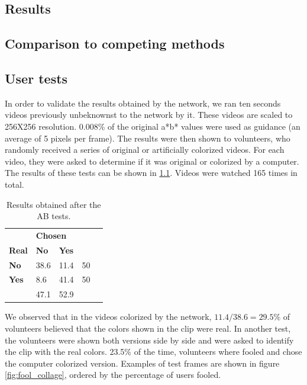 \documentclass[12pt,openright,oneside,a4paper,english]{abntex2}
\begin{document}
\begin{otherlanguage}{english}
\chapter{Results}

\section{Comparison to competing methods}


\section{User tests}

In order to validate the results obtained by the network, we ran ten seconds videos previously unbeknownst to the network by it. These videos are scaled to 256X256 resolution. 0.008\% of the original a*b* values were used as guidance (an average of 5 pixels per frame). The results were then shown to volunteers, who randomly received a series of original or artificially colorized videos. For each video, they were asked to determine if it was original or colorized by a computer. The results of these tests can be shown in \ref{table:ABresults}. Videos were watched 165 times in total.

\begin{table}[H]
\centering
\begin{tabular}{l|l|l|ll}
\cline{2-3}
                                    & \multicolumn{2}{l|}{\textbf{Chosen}} &                           &  \\ \cline{1-3}
\multicolumn{1}{|l|}{\textbf{Real}} & \textbf{No}      & \textbf{Yes}      &                           &  \\ \cline{1-4}
\multicolumn{1}{|l|}{\textbf{No}}   & 38.6             & 11.4              & \multicolumn{1}{l|}{50} &  \\ \cline{1-4}
\multicolumn{1}{|l|}{\textbf{Yes}}  & 8.6              & 41.4              & \multicolumn{1}{l|}{50} &  \\ \cline{1-4}
                                    & 47.1             & 52.9              &                           &  \\ \cline{2-3}
\end{tabular}
\label{table:ABresults}
\caption{Results obtained after the AB tests.}
\end{table}

We observed that in the videos colorized by the network, \(11.4/38.6 = 29.5\% \) of volunteers  believed that the colors shown in the clip were real. In another test, the volunteers were shown both versions side by side and were asked to identify the clip with the real colors. 23.5\% of the time, volunteers where fooled and chose the computer colorized version. Examples of test frames are shown in figure \ref{fig:fool_collage}, ordered by the percentage of users fooled.


\end{otherlanguage}
\end{document}
